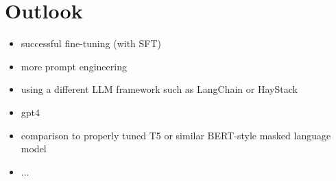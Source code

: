 \chapter{Outlook}\label{chap:Outlook}

\begin{itemize}
    \item successful fine-tuning (with SFT)
    \item more prompt engineering
    \item using a different LLM framework such as LangChain or HayStack
    \item gpt4
    \item comparison to properly tuned T5 or similar BERT-style masked language model
    \item ...
\end{itemize}
